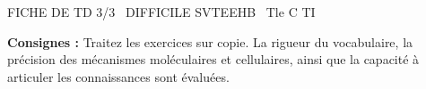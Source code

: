 \documentclass[11pt]{article}
\begin{document}
\begin{tcolorbox}[enhanced,colback=popink,colframe=popink,arc=10pt,boxrule=0pt,left=12pt,right=12pt,top=9pt,bottom=9pt]
{\color{white}\popxbold\small FICHE DE TD 3/3 \textbullet\ DIFFICILE \hfill SVTEEHB \textbullet\ Tle C TI\par}
\end{tcolorbox}
\vspace{4pt}
\noindent\textbf{Consignes :} Traitez les exercices sur copie. La rigueur du vocabulaire, la précision des mécanismes moléculaires et cellulaires, ainsi que la capacité à articuler les connaissances sont évaluées.
\end{document}
